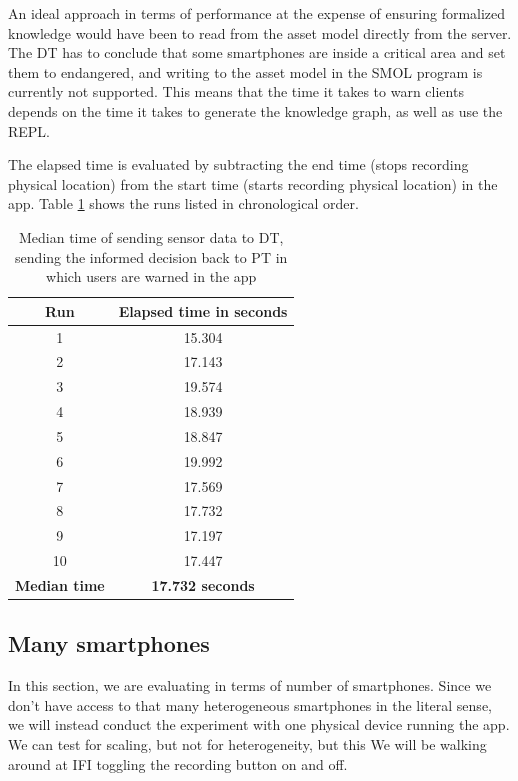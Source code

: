 \documentclass{article}
\begin{document}
An ideal approach in terms of performance at the expense of ensuring formalized knowledge would have been to read from the asset model directly from the server. The DT has to conclude that some smartphones are inside a critical area and set them to endangered, and writing to the asset model in the SMOL program is currently not supported. This means that the time it takes to warn clients depends on the time it takes to generate the knowledge graph, as well as use the REPL.

The elapsed time is evaluated by subtracting the end time (stops recording physical location) from the start time (starts recording physical location) in the app. Table \ref{tab:time_manual_work} shows the runs listed in chronological order.
\begin{table}[H]
    \centering
    \begin{tabular}{|c|c|}
        \hline
        \textbf{Run} & \textbf{Elapsed time in seconds} \\
        \hline
         1 & 15.304 \\ 
         2 & 17.143 \\ 
         3 & 19.574 \\
         4 & 18.939 \\
         5 & 18.847 \\
         6 & 19.992 \\
         7 & 17.569 \\ 
         8 & 17.732 \\ 
         9 & 17.197 \\ 
         10 & 17.447 \\
         \hline
         \textbf{Median time} & \textbf{17.732 seconds} \\
         \hline
    \end{tabular}
    \caption{Median time of sending sensor data to DT, sending the informed decision back to PT in which users are warned in the app}
    \label{tab:time_manual_work}
\end{table}


\subsection{Many smartphones}
In this section, we are evaluating in terms of number of smartphones. Since we don't have access to that many heterogeneous smartphones in the literal sense, we will instead conduct the experiment with one physical device running the app. We can test for scaling, but not for heterogeneity, but this  We will be walking around at IFI toggling the recording button on and off. 
\end{document}

